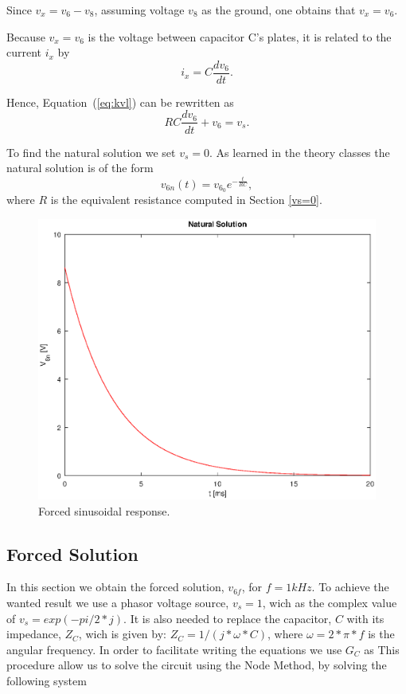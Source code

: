 Since $v_{x}=v_{6}-v_{8}$, assuming voltage $v_8$ as the ground, one obtains that $v_{x}=v_{6}$.

Because $v_{x}=v_{6}$ is the voltage between capacitor C's plates, it is related to the
current $i_x$ by
\begin{equation}
  i_{x} = C\frac{dv_6}{dt}.
\end{equation}

Hence, Equation~(\ref{eq:kvl}) can be rewritten as
\begin{equation}
  RC\frac{dv_6}{dt} + v_6 = v_s.
  \label{eq:kvl2}
\end{equation}

To find the natural solution we set $v_{s}=0$.
As learned in the theory classes the natural solution is of the form
\begin{equation}
  v_{6n}(t) = v_{6_0}e^{-\frac{t}{RC}},
  \label{eq:vo_nat}
\end{equation}
where $R$ is the equivalent resistance computed in Section \ref{vs=0}. 


\begin{figure}[H] \centering
\includegraphics[width=0.8\linewidth]{nat_sol.eps}
\caption{Forced sinusoidal response.}
\label{fig:natural solution}
\end{figure}



\subsection{Forced Solution}
\label{subsec:forced solution}

In this section we obtain the forced solution, $v_{6f}$, for $f=1kHz$.
To achieve the wanted result we use a phasor voltage source, $v_{s}=1$, wich as the complex value of $v_{s}=exp(-pi/2*j)$.
It is also needed to replace the capacitor, $C$ with its impedance, $Z_C$, wich is given by: $Z_{C}= 1/(j*\omega*C)$, where $\omega=2*\pi*f$ is the angular frequency.
In order to facilitate writing the equations we use $G_C$ as %
This procedure allow us to solve the circuit using the Node Method, by solving the following system

